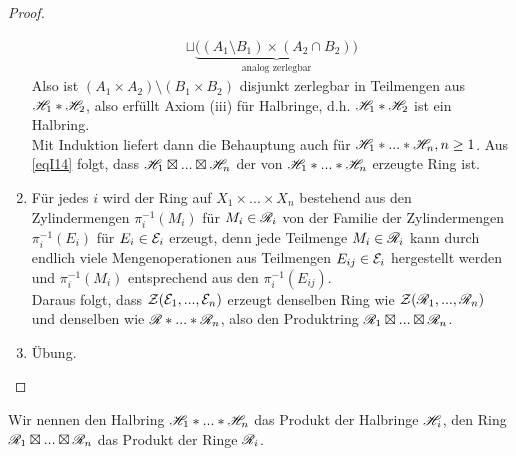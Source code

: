 \begin{proposition}
\begin{proof}
\begin{enumerate}[(\roman*),topsep=5pt]
\begin{equation*}
\begin{split}
		\sqcup \underbrace{\big( (A_1 \setminus B_1) \times (A_2 \cap B_2)\big)}_{\text{analog zerlegbar}}
	\end{split}
	\end{equation*}
	Also ist $(A_1 \times A_2) \setminus (B_1 \times B_2) $ disjunkt zerlegbar in Teilmengen aus $\mathscr{H}_1 \ast \mathscr{H}_2$, also erfüllt Axiom (iii) für Halbringe, d.h.  $\mathscr{H}_1 \ast \mathscr{H}_2$ ist ein Halbring. \\
	Mit Induktion liefert dann die Behauptung auch für $\mathscr{H}_1 \ast ... \ast \mathscr{H}_n, n\geq 1$. \newline
	Aus \eqref{eqI14} folgt, dass $\mathscr{H}_1 \boxtimes ... \boxtimes \mathscr{H}_n$ der von $\mathscr{H}_1 \ast ... \ast \mathscr{H}_n$ erzeugte Ring ist.
	\item Für jedes $i$ wird der Ring auf $X_1 \times ... \times X_n$ bestehend aus den Zylindermengen $\pi_i^{-1}(M_i)$ für $M_i \in \mathscr{R}_i$ von der Familie der Zylindermengen $\pi_i^{-1}(E_i)$ für $E_i \in \mathcal{E}_i$ erzeugt, denn jede Teilmenge $M_i \in \mathscr{R}_i$ kann durch endlich viele Mengenoperationen aus Teilmengen $E_{ij} \in \mathcal{E}_i$ hergestellt werden und $\pi^{-1}_i(M_i)$ entsprechend aus den $\pi_i^{-1}(E_{ij})$. \\
	Daraus folgt, dass $\mathcal{Z}(\mathcal{E}_1,...,\mathcal{E}_n)$ erzeugt denselben Ring wie $\mathcal{Z}( \mathscr{R}_1,...,\mathscr{R}_n)$ und denselben wie $\mathscr{R} \ast ... \ast \mathscr{R}_n$, also den Produktring $\mathscr{R}_1 \boxtimes ... \boxtimes \mathscr{R}_n$. 
	\item Übung.
\end{enumerate}
\end{proof}
\end{proposition}
\begin{definition}
\begin{mdframed}
Wir nennen den Halbring $\mathscr{H}_1 \ast ... \ast \mathscr{H}_n$ das Produkt der Halbringe $\mathscr{H}_i$, den Ring $\mathscr{R}_1 \boxtimes ... \boxtimes \mathscr{R}_n$ das Produkt der Ringe $\mathscr{R}_i$.
\end{mdframed}
\end{definition}

